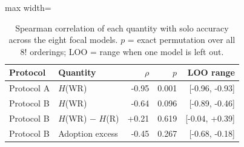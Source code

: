 \begin{table}[t]
\centering
\caption{Spearman correlation of each quantity with solo accuracy across the eight focal models. $p$ = exact permutation over all $8!$ orderings; LOO = range when one model is left out.}
\label{tab:gradient}
\begin{adjustbox}{max width=\linewidth}
\small
\begin{tabular}{@{}llrrr@{}}
\toprule
Protocol & Quantity & $\rho$ & $p$ & LOO range \\
\midrule
Protocol A & $H$(WR) & -0.95 & 0.001 & [-0.96, -0.93] \\
Protocol B & $H$(WR) & -0.64 & 0.096 & [-0.89, -0.46] \\
Protocol B & $H$(WR) $-$ $H$(R) & +0.21 & 0.619 & [-0.04, +0.39] \\
Protocol B & Adoption excess & -0.45 & 0.267 & [-0.68, -0.18] \\
\bottomrule
\end{tabular}
\end{adjustbox}
\end{table}
